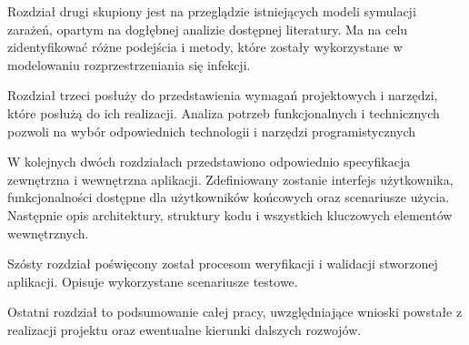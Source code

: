 Rozdział drugi skupiony jest na przeglądzie istniejących modeli symulacji zarażeń, opartym na dogłębnej analizie dostępnej literatury.
Ma na celu zidentyfikować różne podejścia i metody, które zostały wykorzystane w modelowaniu rozprzestrzeniania się infekcji. 

Rozdział trzeci posłuży do przedstawienia wymagań projektowych i narzędzi, które posłużą do ich realizacji. Analiza potrzeb funkcjonalnych i technicznych pozwoli na wybór odpowiednich technologii i narzędzi programistycznych

W kolejnych dwóch rozdziałach przedstawiono odpowiednio specyfikacja zewnętrzna i wewnętrzna aplikacji. Zdefiniowany zostanie interfejs użytkownika, funkcjonalności dostępne dla użytkowników końcowych oraz scenariusze użycia. Następnie opis architektury, struktury kodu i wszystkich kluczowych elementów wewnętrznych. 

Szósty rozdział poświęcony został procesom weryfikacji i walidacji stworzonej aplikacji. Opisuje wykorzystane scenariusze testowe.

Ostatni rozdział to podsumowanie całej pracy, uwzględniające wnioski powstałe z realizacji projektu oraz ewentualne kierunki dalszych rozwojów.
